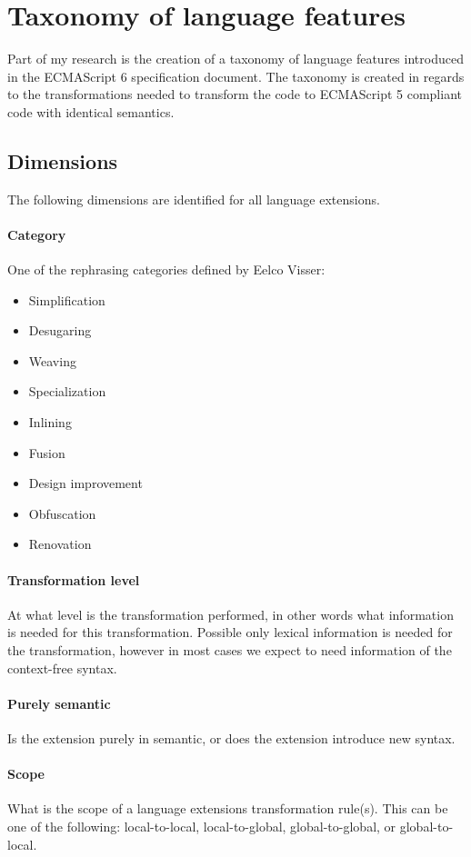 \documentclass[10pt,a4paper]{article}
\begin{document}
\section{Taxonomy of language features}
Part of my research is the creation of a taxonomy of language features introduced in the ECMAScript 6 specification document. The taxonomy is created in regards to the transformations needed to transform the code to ECMAScript 5 compliant code with identical semantics.

\subsection{Dimensions}
The following dimensions are identified for all language extensions.

\paragraph{Category}
One of the rephrasing categories defined by Eelco Visser\cite{Visser2001}:
\\ 
\begin{itemize}
	\item Simplification
	\item Desugaring
	\item Weaving
	\item Specialization
	\item Inlining
	\item Fusion
	\item Design improvement
	\item Obfuscation
	\item Renovation
\end{itemize}

\paragraph{Transformation level}
At what level is the transformation performed, in other words what information is needed for this transformation. Possible only lexical information is needed for the transformation, however in most cases we expect to need information of the context-free syntax.

\paragraph{Purely semantic}
Is the extension purely in semantic, or does the extension introduce new syntax.

\paragraph{Scope}
What is the scope of a language extensions transformation rule(s). This can be one of the following: local-to-local, local-to-global, global-to-global, or global-to-local.
\end{document}
